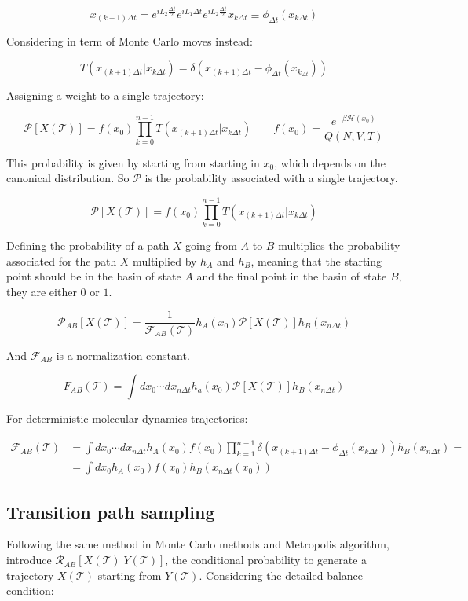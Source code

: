 $$x_{(k+1)\Delta t} = e^{iL_2\frac{\Delta t}{2}}e^{iL_1\Delta t}e^{iL_2\frac{\Delta t}{2}}x_{k\Delta t}\equiv\phi_{\Delta t}(x_{k\Delta t})$$

Considering in term of Monte Carlo moves instead:

$$T(x_{(k+1)\Delta t}|x_{k\Delta t}) = \delta(x_{(k+1)\Delta t}-\phi_{\Delta t}(x_{k_{\Delta t}}))$$

Assigning a weight to a single trajectory:

$$\mathcal{P}[X(\mathcal{T})] = f(x_0)\prod\limits_{k=0}^{n-1}T(x_{(k+1)\Delta t}|x_{k\Delta t})\qquad f(x_0) = \frac{e^{-\beta\mathcal{H}(x_0)}}{Q(N, V, T)}$$

This probability is given by starting from starting in $x_0$, which depends on the canonical distribution.
So $\mathcal{P}$ is the probability associated with a single trajectory.

$$\mathcal{P}[X(\mathcal{T})] = f(x_0)\prod\limits_{k=0}^{n-1}T(x_{(k+1)\Delta t}|x_{k\Delta t})$$


Defining the probability of a path $X$ going from $A$ to $B$ multiplies the probability associated for the path $X$ multiplied by $h_A$ and $h_B$, meaning that the starting point should be in the basin of state $A$ and the final point in the basin of state $B$, they are either $0$ or $1$.

$$\mathcal{P}_{AB}[X(\mathcal{T})] = \frac{1}{\mathcal{F}_{AB}(\mathcal{T})}h_A(x_0)\mathcal{P}[X(\mathcal{T})]h_B(x_{n\Delta t})$$

And $\mathcal{F}_{AB}$ is a normalization constant.

$$F_{AB}(\mathcal{T}) = \int dx_0\cdots dx_{n\Delta t}h_a(x_0)\mathcal{P}[X(\mathcal{T})]h_B(x_{n\Delta t})$$

For deterministic molecular dynamics trajectories:

\begin{align*}
	\mathcal{F}_{AB}(\mathcal{T}) &= \int dx_0\cdots dx_{n\Delta t}h_A(x_0)f(x_0)\prod\limits_{k=1}^{n-1}\delta(x_{(k+1)\Delta t}-\phi_{\Delta t}(x_{k\Delta t}))h_B(x_{n\Delta t}) = \\
																&=\int dx_0h_A(x_0)f(x_0)h_B(x_{n\Delta t}(x_0))
\end{align*}

	\subsection{Transition path sampling}
	Following the same method in Monte Carlo methods and Metropolis algorithm, introduce $\mathcal{R}_{AB}[X(\mathcal{T})|Y(\mathcal{T})]$, the conditional probability to generate a trajectory $X(\mathcal{T})$ starting from $Y(\mathcal{T})$.
	Considering the detailed balance condition:

